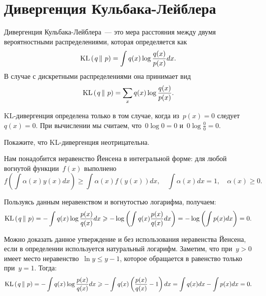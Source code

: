 \documentclass[12pt,fleqn]{article}
\begin{document}
\section{Дивергенция Кульбака-Лейблера}
Дивергенция Кульбака-Лейблера~--- это мера расстояния между двумя
вероятностными распределениями, которая определяется как
\[
    \text{KL} \left(\left. {q} \mspace{3mu} \right\| \mspace{3mu} {p} \right)
    =
    \int
        q(x)
        \log \frac{q(x)}{p(x)}
        dx.
\]
В случае с дискретными распределениями она принимает вид
\[
    \text{KL} \left(\left. {q} \mspace{3mu} \right\| \mspace{3mu} {p} \right)
    =
    \sum_{x}
        q(x)
        \log \frac{q(x)}{p(x)}.
\]

KL-дивергенция определена только в том случае, когда
из~$p(x) = 0$ следует~$q(x) = 0$.
При вычислении мы считаем, что~$0 \log 0 = 0$
и~$0 \log \frac{0}{0} = 0$.

\begin{vkProblem}
    Покажите, что KL-дивергенция неотрицательна.
\end{vkProblem}

\begin{esSolution}
    Нам понадобится неравенство Йенсена в интегральной форме:
    для любой вогнутой функции~$f(x)$ выполнено
    \[
        f\left(
            \int \alpha(x) y(x) dx
        \right)
        \geq
        \int \alpha(x) f(y(x)) dx,
        \quad
        \int \alpha(x) dx = 1,
        \quad
        \alpha(x) \geq 0.
    \]

    Пользуясь данным неравенством и вогнутостью логарифма, получаем:
    \[
        \text{KL} \left(\left. {q} \mspace{3mu} \right\| \mspace{3mu} {p} \right)
        =
        - \int
            q(x)
            \log \frac{p(x)}{q(x)}
            dx
        \geqslant
        - \log\left(
            \int
            q(x)
            \frac{p(x)}{q(x)}
            dx
        \right)
        =
        - \log\left(
            \int
            p(x)
            dx
        \right)
        =
        0.
    \]

    Можно доказать данное утверждение и без использования неравенства Йенсена,
    если в определении используется натуральный логарифм.
    Заметим, что при~$y > 0$ имеет место неравенство~$\ln y \leq y - 1$,
    которое обращается в равенство только при~$y = 1$.
    Тогда:
    \[
        \text{KL} \left(\left. {q} \mspace{3mu} \right\| \mspace{3mu} {p} \right)
        =
        - \int
            q(x)
            \log \frac{p(x)}{q(x)}
            dx
        \geqslant
        - \int
            q(x)
            \left(
                \frac{p(x)}{q(x)} - 1
            \right)
            dx
        =
        \int q(x) dx
        -
        \int p(x) dx
        =
        0.
    \]
\end{esSolution}
\end{document}
